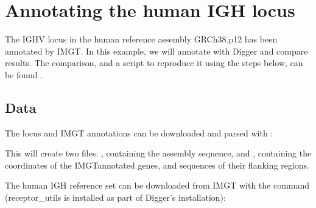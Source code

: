 \documentclass[letterpaper,10pt,english]{sphinxmanual}
\begin{document}
\sphinxstepscope


\chapter{Annotating the human IGH locus}
\label{\detokenize{examples/human_igh:annotating-the-human-igh-locus}}\label{\detokenize{examples/human_igh:human-igh}}\label{\detokenize{examples/human_igh::doc}}
\sphinxAtStartPar
The IGHV locus in the human reference assembly GRCh38.p12 has been annotated by IMGT. In this example, we will annotate with Digger and compare results.
The comparison, and a script to reproduce it using the steps below, can be found .


\section{Data}
\label{\detokenize{examples/human_igh:data}}
\sphinxAtStartPar
The locus and IMGT annotations can be downloaded and parsed with {\hyperref[\detokenize{tools/parse_imgt_annotations:parse-imgt-annotations}]{}}:

\begin{sphinxVerbatim}[commandchars=\\\{\}]
  \PYGZbs{}
      \PYGZbs{}
         \PYGZbs{}
         \PYGZbs{}
\end{sphinxVerbatim}

\sphinxAtStartPar
This will create two files: , containing the assembly sequence, and , containing the co\sphinxhyphen{}ordinates of the IMGT\sphinxhyphen{}annotated genes, and sequences of their flanking regions.

\sphinxAtStartPar
The human IGH reference set can be downloaded from IMGT with the  command  (receptor\_utils is installed as part of Digger’s installation):
\end{document}
